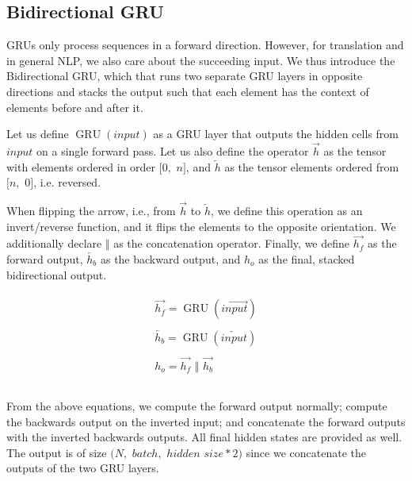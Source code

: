 \documentclass[twoside,twocolumn]{article}
\begin{document}
\subsection{Bidirectional GRU}
\label{sec:bidirectional}

GRUs only process sequences in a forward direction. However, for
translation and in general NLP, we also care about the succeeding input.
We thus introduce the Bidirectional GRU, which that runs two separate GRU
layers in opposite directions and stacks the output such that each element has
the context of elements before and after it.

Let us define $\operatorname{GRU}(input)$ as a GRU layer that outputs the
hidden cells from $input$ on a single forward pass. Let us also define the
operator $\overrightarrow{h}$ as the tensor with elements ordered in
order $[0,$ $n]$, and $\overleftarrow{h}$ as the tensor elements ordered
from $[n,$ $0]$, i.e. reversed.

When flipping the arrow, i.e., from $\overrightarrow{h}$ to
$\overleftarrow{h}$, we define this operation as an invert/reverse
function, and it flips the elements to the opposite orientation. We
additionally declare $\Vert$ as the concatenation operator. Finally, we
define $\overrightarrow{h_f}$ as the forward output, $\overleftarrow{h_b}$
as the backward output, and $h_o$ as the final, stacked bidirectional output.

\begin{equation}
  \label{eq:bidirectional}
  \begin{split}
    \begin{array}{ll}
      \overrightarrow{h_f} = \operatorname{GRU}(\overrightarrow{input})\\
      \\
      \overleftarrow{h_b} = \operatorname{GRU}(\overleftarrow{input})\\
      \\
      h_o = \overrightarrow{h_f} \,\,\Vert \,\, \overrightarrow{h_b}\\
      \\
    \end{array}
  \end{split}
\end{equation}

From the above equations, we compute the forward output normally; compute the
backwards output on the inverted input; and concatenate the forward outputs
with the inverted backwards outputs. All final hidden states are provided as
well. The output is of size $(N,$ $batch,$ $hidden$ $size*2)$ since we
concatenate the outputs of the two GRU layers.
\end{document}

